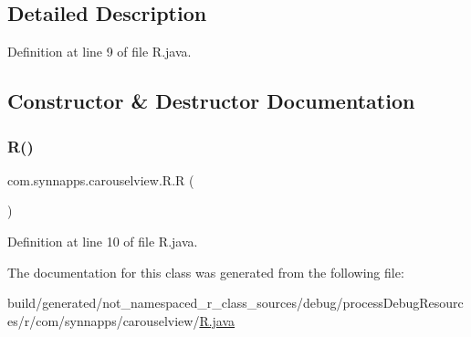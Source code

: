 \subsection{Detailed Description}


Definition at line 9 of file R.\+java.



\subsection{Constructor \& Destructor Documentation}
\mbox{\label{classcom_1_1synnapps_1_1carouselview_1_1_r_a5e75877ef0f4ca77bd243cb74dcfee95}} 
\subsubsection{\texorpdfstring{R()}{R()}}
{\footnotesize\ttfamily com.\+synnapps.\+carouselview.\+R.\+R (\begin{DoxyParamCaption}{ }\end{DoxyParamCaption})\hspace{0.3cm}{\ttfamily [private]}}



Definition at line 10 of file R.\+java.


\begin{DoxyCode}{0}

\end{DoxyCode}


The documentation for this class was generated from the following file\+:\begin{DoxyCompactItemize}
\item 
build/generated/not\+\_\+namespaced\+\_\+r\+\_\+class\+\_\+sources/debug/process\+Debug\+Resources/r/com/synnapps/carouselview/\mbox{\hyperlink{com_2synnapps_2carouselview_2_r_8java}{R.\+java}}\end{DoxyCompactItemize}
